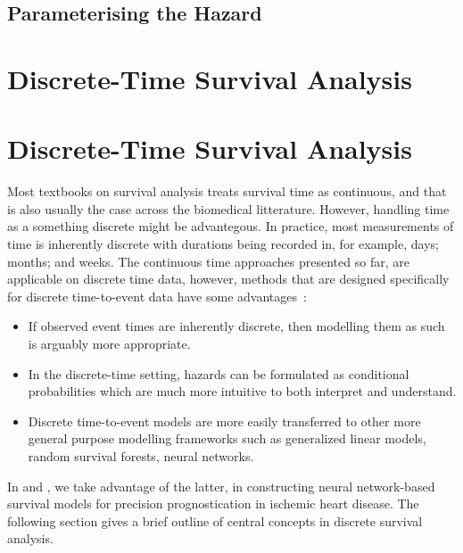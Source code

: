 \subsection{Parameterising the Hazard}


\section{Discrete-Time Survival Analysis}









\section{Discrete-Time Survival Analysis}

Most textbooks on survival analysis treats survival time as continuous, 
and that is also usually the case across the biomedical litterature.
However, handling time as a something discrete might be advantegous.
In practice, most measurements of time is inherently discrete 
with durations being recorded in, for example, days; months; and weeks.
The continuous time approaches presented so far, 
are applicable on discrete time data,
however, methods that are designed specifically for discrete time-to-event 
data have some advantages~\autocite{tutzModeling2016}:

\begin{itemize}
    \item If observed event times are inherently discrete, 
        then modelling them as such is arguably more appropriate. 
    \item In the discrete-time setting, hazards can be formulated as 
        conditional probabilities which are much more intuitive to 
        both interpret and understand.
    \item Discrete time-to-event models are more easily transferred to 
        other more general purpose modelling frameworks 
        such as generalized linear models, random survival forests, 
        neural networks.
\end{itemize}

In  and , 
we take advantage of the latter,
in constructing neural network-based survival models
for precision prognostication in ischemic heart disease.
The following section gives a brief outline of
central concepts in discrete survival analysis. 

